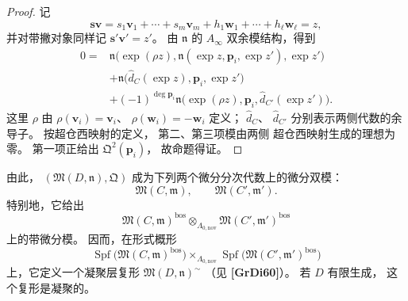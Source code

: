 \begin{proof}
记
\[
\boldsymbol s\boldsymbol v
=s_1\mathbf v_1+\cdots+s_m\mathbf v_m
+h_1\mathbf w_1+\cdots+h_\ell\mathbf w_\ell
=z,
\]
并对带撇对象同样记
$\boldsymbol s'\boldsymbol v'=z'$。
由 $\mathfrak n$ 的
$A_\infty$ 双余模结构，得到
\[
\begin{aligned}
0={}&
\mathfrak n\bigl(
\exp(\rho z),
\mathfrak n(\exp z,\mathbf p_i,\exp z'),
\exp z'
\bigr)\\
&+
\mathfrak n\bigl(
\widehat d_C(\exp z),
\mathbf p_i,\exp z'
\bigr)\\
&+
(-1)^{\deg\mathbf p_i}
\mathfrak n\bigl(
\exp(\rho z),
\mathbf p_i,
\widehat d_{C'}(\exp z')
\bigr).
\end{aligned}
\]
这里 $\rho$ 由
$\rho(\mathbf v_i)=\mathbf v_i$、
$\rho(\mathbf w_i)=-\mathbf w_i$
定义；
$\widehat d_C$、
$\widehat d_{C'}$
分别表示两侧代数的余导子。
按超仓西映射的定义，
第二、第三项模由两侧
超仓西映射生成的理想为零。
第一项正给出
$\mathfrak Q^2(\mathbf p_i)$，
故命题得证。
\end{proof}

由此，
$(\mathfrak M(D,\mathfrak n),\mathfrak Q)$
成为下列两个微分分次代数上的微分双模：
\[
\mathfrak M(C,\mathfrak m),
\qquad
\mathfrak M(C',\mathfrak m').
\]
特别地，它给出
\[
\mathfrak M(C,\mathfrak m)^{\mathrm{bos}}
\otimes_{\Lambda_{0,\mathrm{nov}}}
\mathfrak M(C',\mathfrak m')^{\mathrm{bos}}
\]
上的带微分模。
因而，在形式概形
\[
\operatorname{Spf}
\bigl(\mathfrak M(C,\mathfrak m)^{\mathrm{bos}}\bigr)
\times_{\Lambda_{0,\mathrm{nov}}}
\operatorname{Spf}
\bigl(\mathfrak M(C',\mathfrak m')^{\mathrm{bos}}\bigr)
\]
上，它定义一个凝聚层复形
$\mathfrak M(D,\mathfrak n)^{\sim}$
（见 \textbf{[GrDi60]}）。
若 $D$ 有限生成，
这个复形是凝聚的。

